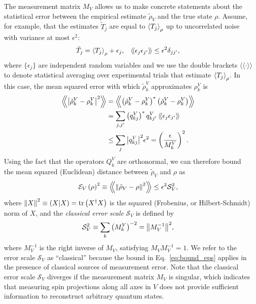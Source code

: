 \documentclass[notitlepage,twocolumn]{revtex4-2}
\newcommand{\f}[2]{\dfrac{#1}{#2}} %
\newcommand{\p}[1]{\left(#1\right)} %
\newcommand{\bk}{\Braket} %
\renewcommand{\set}[1]{\{#1\}} %
\newcommand{\bbk}[1]{\langle\!\langle #1 \rangle\!\rangle}
\newcommand{\Bbk}[1]
{\left\langle\!\!\left\langle #1 \right\rangle\!\!\right\rangle}
\newcommand{\E}{\mathcal{E}}
\renewcommand{\S}{\mathcal{S}}
\def\obk#1{\mathinner{({#1})}}
\begin{document}
The measurement matrix $M_V$ allows us to make concrete statements about the statistical error between the empirical estimate $\tilde\rho_V$ and the true state $\rho$.
Assume, for example, that the estimates $\tilde T_j$ are equal to $\bk{T_j}_\rho$ up to uncorrelated noise with variance at most $\epsilon^2$:
\begin{align}
  \tilde T_j = \bk{T_j}_\rho + \epsilon_j,
  &&
  \bbk{\epsilon_j \epsilon_{j'}} \le \epsilon^2 \delta_{jj'},
  \label{eq:error_assumption}
\end{align}
where $\set{\epsilon_j}$ are independent random variables and we use the double brackets $\bbk{\cdot}$ to denote statistical averaging over experimental trials that estimate $\bk{T_j}_\rho$.
In this case, the mean squared error with which $\tilde\rho^V_k$ approximates $\rho^V_k$ is
\begin{align}
  \Bbk{\abs{\tilde\rho^V_k-\rho^V_k}^2}
  &= \Bbk{\p{\tilde\rho^V_k-\rho^V_k}^*\p{\tilde\rho^V_k-\rho^V_k}} \\
  &= \sum_{j,j'} \p{q^V_{kj}}^* q^V_{kj'}\,
  \bbk{\epsilon_j \epsilon_{j'}} \\
  &\le \sum_j \abs{q^V_{kj}}^2 \epsilon^2
  = \p{\f{\epsilon}{M^V_k}}^2.
\end{align}
Using the fact that the operators $Q^V_k$ are orthonormal, we can therefore bound the mean squared (Euclidean) distance between $\tilde\rho_V$ and $\rho$ as
\begin{align}
  \E_V\p{\rho}^2
  \equiv \Bbk{\norm{\tilde\rho_V-\rho}^2}
  \le \epsilon^2 \S_V^2,
  \label{eq:bound_eps}
\end{align}
where $\norm{X}^2 \equiv \obk{X|X} = \tr\p{X^\dag X}$ is the squared (Frobenius, or Hilbert-Schmidt) norm of $X$, and the {\it classical error scale} $\S_V$ is defined by
\begin{align}
  \S_V^2 \equiv \sum_k \p{M^V_k}^{-2} = \norm{M_V^{-1}}^2,
\end{align}
where $M_V^{-1}$ is the right inverse of $M_V$, satisfying $M_V M_V^{-1}=1$.
We refer to the error scale $\S_V$ as ``classical'' because the bound in Eq.~\eqref{eq:bound_eps} applies in the presence of classical sources of measurement error.
Note that the classical error scale $\S_V$ diverges if the measurement matrix $M_V$ is singular, which indicates that measuring spin projections along all axes in $V$ does not provide sufficient information to reconstruct arbitrary quantum states.
\end{document}
